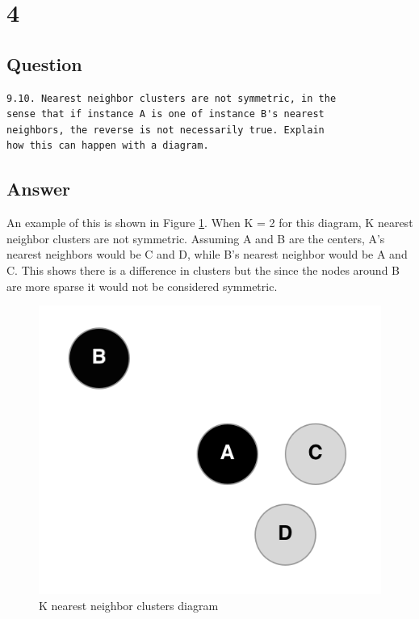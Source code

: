 \documentclass[letterpaper,11pt]{article}
\begin{document}
\clearpage



\section*{4}

\subsection*{Question}

\begin{verbatim}
9.10. Nearest neighbor clusters are not symmetric, in the 
sense that if instance A is one of instance B's nearest 
neighbors, the reverse is not necessarily true. Explain
how this can happen with a diagram.
\end{verbatim}

\subsection*{Answer}

An example of this is shown in Figure \ref{fig:knn}.
When K = 2 for this diagram, K nearest neighbor clusters are not symmetric.
Assuming A and B are the centers, A's nearest neighbors would be C and D, while B's nearest neighbor would be A and C.
This shows there is a difference in clusters but the since the nodes around B are more sparse it would not be considered symmetric.

\begin{figure}[h]
\centering
\includegraphics[scale=0.5]{knn_diagram.png}
\caption{K nearest neighbor clusters diagram}
\label{fig:knn}
\end{figure}
\end{document}
